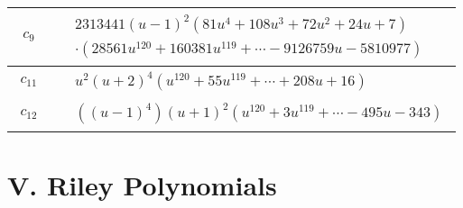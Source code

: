 \documentclass[1p]{elsarticle_modified}
\theoremstyle{definition}
\begin{document}
\begin{tabular}{m{50pt}|m{274pt}}
\hline $$\begin{aligned}c_{9}\end{aligned}$$&$\begin{aligned}
&2313441(u-1)^2(81 u^4+108 u^3+72 u^2+24 u+7)\\
&\cdot(28561 u^{120}+160381 u^{119}+\cdots-9126759 u-5810977)
\end{aligned}$\\
\hline $$\begin{aligned}c_{11}\end{aligned}$$&$\begin{aligned}
&u^2(u+2)^4(u^{120}+55 u^{119}+\cdots+208 u+16)
\end{aligned}$\\
\hline $$\begin{aligned}c_{12}\end{aligned}$$&$\begin{aligned}
&((u-1)^4)(u+1)^2(u^{120}+3 u^{119}+\cdots-495 u-343)
\end{aligned}$\\
\hline
\end{tabular}\newpage\renewcommand{\arraystretch}{1}
\centering \section*{ V. Riley Polynomials}
\end{document}

